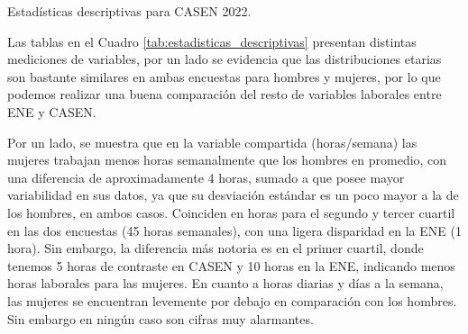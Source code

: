 \begin{table}[htbp]
	\begin{subtable}[ht]{\textwidth}
		\centering
		\caption{Estadísticas descriptivas para CASEN 2022.}
	\end{subtable}
	
	\caption{Estadísticas descriptivas para hombres y mujeres.}
	\label{tab:estadisticas_descriptivas}
	
\end{table}

\FloatBarrier

Las tablas en el Cuadro \ref{tab:estadisticas_descriptivas} presentan distintas mediciones de variables, por un lado se evidencia que las distribuciones etarias son bastante similares en ambas encuestas para hombres y mujeres, por lo que podemos realizar una buena comparación del resto de variables laborales entre ENE y CASEN. 

Por un lado, se muestra que en la variable compartida (horas/semana) las mujeres trabajan menos horas semanalmente que los hombres en promedio, con una diferencia de aproximadamente 4 horas, sumado a que posee mayor variabilidad en sus datos, ya que su desviación estándar es un poco mayor a la de los hombres, en ambos casos. Coinciden en horas para el segundo y tercer cuartil en las dos encuestas (45 horas semanales), con una ligera disparidad en la ENE (1 hora). Sin embargo, la diferencia más notoria es en el primer cuartil, donde tenemos 5 horas de contraste en CASEN y 10 horas en la ENE, indicando menos horas laborales para las mujeres. En cuanto a horas diarias y días a la semana, las mujeres se encuentran levemente por debajo en comparación con los hombres. Sin embargo en ningún caso son cifras muy alarmantes.


